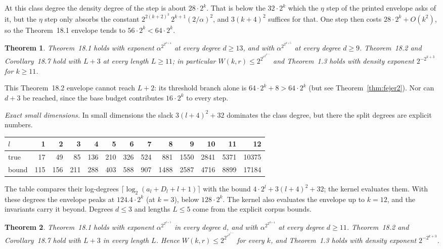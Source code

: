 \documentclass[11pt]{article}
\newtheorem{theorem}{Theorem}
\theoremstyle{definition}
\theoremstyle{remark}
\begin{document}
At this class degree the density degree of the step is about $28\cdot2^k$.
That is below the $32\cdot2^k$ which the $\eta$ step of the printed
envelope asks of it, but the $\eta$ step only absorbs the constant
$2^{2(k+2)^3}\,2^{k+1}(2/\alpha)^2$, and $3(k+4)^2$ suffices for that. One
step then costs $28\cdot2^k+O(k^2)$, so the Theorem~18.1 envelope tends to
$56\cdot2^k<64\cdot2^k$.

\begin{theorem}\label{thm:fejer4}
Theorem~18.1 holds with exponent $\alpha^{2^{2^{d+4}}}$ at every degree
$d\ge13$, and with $\alpha^{2^{2^{d+5}}}$ at every degree $d\ge9$.
Theorem~18.2 and Corollary~18.7 hold with $L+3$ at every length $L\ge11$; in
particular $W(k,r)\le2^{2^{r^{2^{2^{k+3}}}}}$ and Theorem~1.3 holds with
density exponent $2^{-2^{k+3}}$ for $k\ge11$.
\end{theorem}

This Theorem~18.2 envelope cannot reach $L+2$: its threshold branch alone is
$64\cdot2^k+8>64\cdot2^k$ (but see Theorem~\ref{thm:fejer2}). Nor can $d+3$ be
reached, since the base budget contributes $16\cdot2^k$ to every step.

\emph{Exact small dimensions.} In small dimensions the slack $3(l+4)^2+32$
dominates the class degree, but there the split degrees are explicit numbers.
\begin{center}\small
\begin{tabular}{l*{12}{r}}
\toprule
$l$ & 1 & 2 & 3 & 4 & 5 & 6 & 7 & 8 & 9 & 10 & 11 & 12\\
\midrule
true & 17 & 49 & 85 & 136 & 210 & 326 & 524 & 881 & 1550 & 2841 & 5371 & 10375\\
bound & 115 & 156 & 211 & 288 & 403 & 588 & 907 & 1488 & 2587 & 4716 & 8899 & 17184\\
\bottomrule
\end{tabular}
\end{center}
The table compares their log-degrees $\lceil\log_2(a_l+D_l+l+1)\rceil$ with
the bound $4\cdot2^l+3(l+4)^2+32$; the kernel evaluates them. With these
degrees the envelope peaks at $124.4\cdot2^k$ (at $k=3$), below
$128\cdot2^k$. The kernel also evaluates the envelope up to $k=12$, and the
invariants carry it beyond. Degrees $d\le3$ and lengths $L\le5$ come from the
explicit corpus bounds.

\begin{theorem}\label{thm:fejer5all}
Theorem~18.1 holds with exponent $\alpha^{2^{2^{d+5}}}$ in every degree $d$,
and with $\alpha^{2^{2^{d+4}}}$ at every degree $d\ge11$. Theorem~18.2 and
Corollary~18.7 hold with $L+3$ in every length $L$. Hence
$W(k,r)\le2^{2^{r^{2^{2^{k+3}}}}}$ for every $k$, and Theorem~1.3 holds with
density exponent $2^{-2^{k+3}}$.
\end{theorem}
\end{document}
